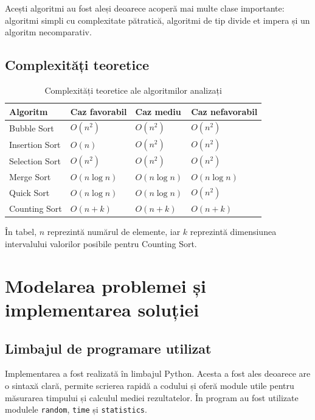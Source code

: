 \documentclass[a4paper,12pt]{article}
\begin{document}
Acești algoritmi au fost aleși deoarece acoperă mai multe clase importante: algoritmi simpli cu complexitate pătratică, algoritmi de tip divide et impera și un algoritm necomparativ.

\subsection{Complexități teoretice}

\begin{table}[H]
\centering
\caption{Complexități teoretice ale algoritmilor analizați}
\label{tab:complexitati}
\begin{tabular}{>{\raggedright\arraybackslash}p{3.2cm} >{\centering\arraybackslash}p{3cm} >{\centering\arraybackslash}p{3cm} >{\centering\arraybackslash}p{3cm}}
\toprule
\textbf{Algoritm} & \textbf{Caz favorabil} & \textbf{Caz mediu} & \textbf{Caz nefavorabil} \\
\midrule
Bubble Sort & $O(n^2)$ & $O(n^2)$ & $O(n^2)$ \\
Insertion Sort & $O(n)$ & $O(n^2)$ & $O(n^2)$ \\
Selection Sort & $O(n^2)$ & $O(n^2)$ & $O(n^2)$ \\
Merge Sort & $O(n \log n)$ & $O(n \log n)$ & $O(n \log n)$ \\
Quick Sort & $O(n \log n)$ & $O(n \log n)$ & $O(n^2)$ \\
Counting Sort & $O(n+k)$ & $O(n+k)$ & $O(n+k)$ \\
\bottomrule
\end{tabular}
\end{table}

În tabel, $n$ reprezintă numărul de elemente, iar $k$ reprezintă dimensiunea intervalului valorilor posibile pentru Counting Sort.

\section{Modelarea problemei și implementarea soluției}

\subsection{Limbajul de programare utilizat}
Implementarea a fost realizată în limbajul Python. Acesta a fost ales deoarece are o sintaxă clară, permite scrierea rapidă a codului și oferă module utile pentru măsurarea timpului și calculul mediei rezultatelor. În program au fost utilizate modulele \texttt{random}, \texttt{time} și \texttt{statistics}.
\end{document}
